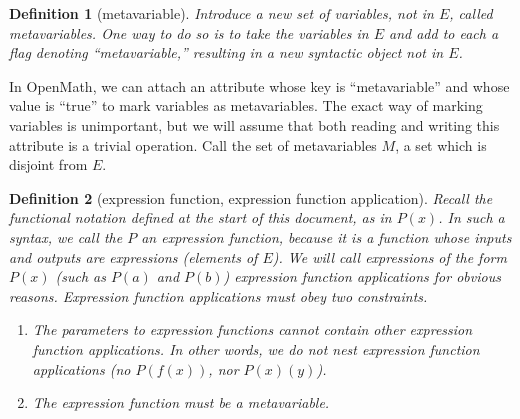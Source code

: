 \documentclass{article}
\newtheorem{dfn}{Definition}
\begin{document}
%
%
%
\begin{dfn}[metavariable]
Introduce a new set of variables, not in $E$, called \emph{metavariables}.  One way to do so is to take the variables in $E$ and add to each a flag denoting ``metavariable,'' resulting in a new syntactic object not in $E$.
\end{dfn}

In OpenMath, we can attach an attribute whose key is ``metavariable'' and whose value is ``true'' to mark variables as metavariables.  The exact way of marking variables is unimportant, but we will assume that both reading and writing this attribute is a trivial operation.  Call the set of metavariables $M$, a set which is disjoint from $E$.

\begin{dfn}[expression function, expression function application]\label{D:efa}
Recall the \emph{functional notation} defined at the start of this document, as in $P(x)$.  In such a syntax, we call the $P$ an \emph{expression function,} because it is a function whose inputs and outputs are expressions (elements of $E$).  We will call expressions of the form $P(x)$ (such as $P(a)$ and $P(b)$) \emph{expression function applications} for obvious reasons.  Expression function applications must obey two constraints.
\begin{enumerate}
\item	The parameters to expression functions cannot contain other expression function applications.  In other words, we do not nest expression function applications (no $P(f(x))$, nor $P(x)(y)$).
\item	The expression function must be a metavariable.
\end{enumerate}
\end{dfn}
\end{document}
